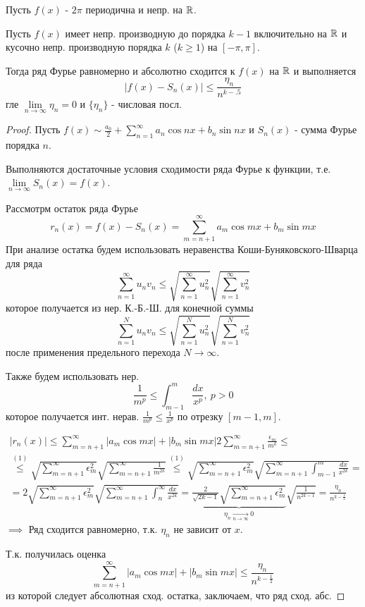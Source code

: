 \documentclass{article}
\begin{document}
\begin{theorem}
  Пусть $f(x)$ - $2\pi$ периодична и непр. на $\mathbb{R}$.

  Пусть $f(x)$ имеет непр. производную до порядка $k-1$ включительно на $\mathbb{R}$
  и кусочно непр. производную порядка $k$ ($k\ge 1$) на $[-\pi,\pi]$.
  
  Тогда ряд Фурье равномерно и абсолютно сходится к $f(x)$ на $\mathbb{R}$
  и выполняется 
  \[
    |f(x)-S_n(x)| \le \frac{\eta_n}{n^{k-.5}}
  \]
  гле $\lim \limits_{n\to \infty} \eta_n =0$ и $\{\eta_n\}$ - числовая посл.
\end{theorem}
\begin{proof}
  Пусть $f(x) \sim \frac{a_0}{2}+\sum_{n=1}^{\infty}a_n\cos nx + b_n \sin nx$
  и $S_n(x)$ - сумма Фурье порядка $n$.

  Выполняются достаточные условия сходимости ряда Фурье к функции,
  т.е. $\lim \limits_{n\to \infty} S_n(x)=f(x)$.

  Рассмотрм остаток ряда Фурье
  \[
    r_n(x)=f(x)-S_n(x)=\sum_{m=n+1}^{\infty}a_m\cos mx + b_m \sin mx
  \]
  \hr
  При анализе остатка будем использовать неравенства Коши-Буняковского-Шварца
  для ряда
  \[
    \sum_{n=1}^{\infty}u_nv_n \le \sqrt{\sum_{n=1}^{\infty}u_n^{2}}\sqrt{\sum_{n=1}^{\infty}v_n^{2}} \tag{$1$}
  \]
  которое получается из нер. К.-Б.-Ш. для конечной суммы
  \[
    \sum_{n=1}^{N}u_nv_n \le \sqrt{\sum_{n=1}^{N}u_n^{2}}\sqrt{\sum_{n=1}^{N}v_n^{2}}
  \]
  после применения предельного перехода $N\to\infty$.

  Также будем использовать нер.
  \[
    \frac{1}{m^{p}} \le \int_{m-1}^{m}\frac{dx}{x^{p}}, \ p>0 \tag{$2$}
  \]
  которое получается инт. нерав. $\frac{1}{m^{p}}\le \frac{1}{x^{p}}$
  по отрезку $[m-1,m]$.

  \hr
  \begin{gather*}
    |r_n(x)| \le \sum_{m=n+1}^{\infty}|a_m \cos mx| +|b_m\sin mx|
    2\sum_{m=n+1}^{\infty}\frac{\epsilon_m}{m^{k}} \le \\
    \overset{(1)}{\le} \sqrt{\sum_{m=n+1}^{\infty}\epsilon_m^{2}}\sqrt{\sum_{m=n+1}^{\infty}\frac{1}{m^{2k}}}
    \overset{(1)}{\le} \sqrt{\sum_{m=n+1}^{\infty}\epsilon_m^{2}}\sqrt{\sum_{m=n+1}^{\infty}\int_{m-1}^{m}\frac{dx}{x^{2k}}} = \\
    = 2\sqrt{\sum_{m=n+1}^{\infty}\epsilon_m^{2}}\sqrt{\sum_{m=n+1}^{\infty}\int_{n}^{\infty}\frac{dx}{x^{2k}}}
    = \underbrace{\frac{2}{\sqrt{2k-1}}\sqrt{\sum_{m=n+1}^{\infty}\epsilon_m^{2}}}_{\eta_n \underset{n\to\infty}{\to}0}\sqrt{\frac{1}{n^{2k-1}}}
    = \frac{\eta_n}{n^{k-\frac{1}{2}}}
  \end{gather*}
  $\implies$ Ряд сходится равномерно, т.к. $\eta_n$ не зависит от $x$.

  Т.к. получилась оценка
  \[
    \sum_{m=n+1}^{\infty}|a_m\cos mx| + |b_m\sin mx| \le \frac{\eta_n}{n^{k-\frac{1}{2}}}
  \]
  из которой следует абсолютная сход. остатка, заключаем, что ряд сход. абс.
\end{proof}
\end{document}
